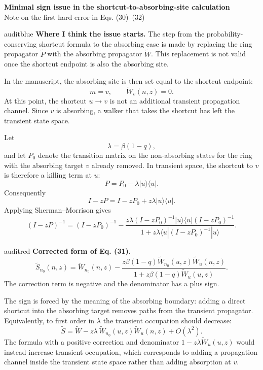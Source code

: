 \documentclass[11pt]{article}
\begin{document}
\begin{center}
{\Large\bfseries Minimal sign issue in the shortcut-to-absorbing-site calculation}\\[0.35em]
{\small Note on the first hard error in Eqs. (30)--(32)}
\end{center}

\begin{issuebox}{auditblue}
\textbf{Where I think the issue starts.}
The step from the probability-conserving shortcut formula to the absorbing
case is made by replacing the ring propagator $\widetilde P$ with the absorbing
propagator $\widetilde W$.  This replacement is not valid once the shortcut
endpoint is also the absorbing site.
\end{issuebox}

In the manuscript, the absorbing site is then set equal to the shortcut
endpoint:
\[
m=v,\qquad \widetilde W_v(n,z)=0.
\]
At this point, the shortcut $u\to v$ is not an additional transient propagation
channel.  Since $v$ is absorbing, a walker that takes the shortcut has left the
transient state space.

Let
\[
\lambda=\beta(1-q),
\]
and let $P_0$ denote the transition matrix on the non-absorbing states for the
ring with the absorbing target $v$ already removed.  In transient space, the
shortcut to $v$ is therefore a killing term at $u$:
\[
\boxed{P=P_0-\lambda |u\rangle\langle u|.}
\]
Consequently
\[
I-zP=I-zP_0+z\lambda |u\rangle\langle u|.
\]
Applying Sherman--Morrison gives
\[
(I-zP)^{-1}
=(I-zP_0)^{-1}
-\frac{
z\lambda (I-zP_0)^{-1}|u\rangle\langle u|(I-zP_0)^{-1}
}{
1+z\lambda\langle u|(I-zP_0)^{-1}|u\rangle
}.
\]

\begin{issuebox}{auditred}
\textbf{Corrected form of Eq. (31).}
\[
\boxed{
\widetilde S_{n_0}(n,z)
=\widetilde W_{n_0}(n,z)
-\frac{
z\beta(1-q)\widetilde W_{n_0}(u,z)\widetilde W_u(n,z)
}{
1+z\beta(1-q)\widetilde W_u(u,z)
}.}
\]
The correction term is negative and the denominator has a plus sign.
\end{issuebox}

The sign is forced by the meaning of the absorbing boundary: adding a direct
shortcut into the absorbing target removes paths from the transient propagator.
Equivalently, to first order in $\lambda$ the transient occupation should
decrease:
\[
\widetilde S
=\widetilde W
-z\lambda\,\widetilde W_{n_0}(u,z)\widetilde W_u(n,z)
+O(\lambda^2).
\]
The formula with a positive correction and denominator
$1-z\lambda\widetilde W_u(u,z)$ would instead increase transient occupation,
which corresponds to adding a propagation channel inside the transient state
space rather than adding absorption at $v$.
\end{document}
